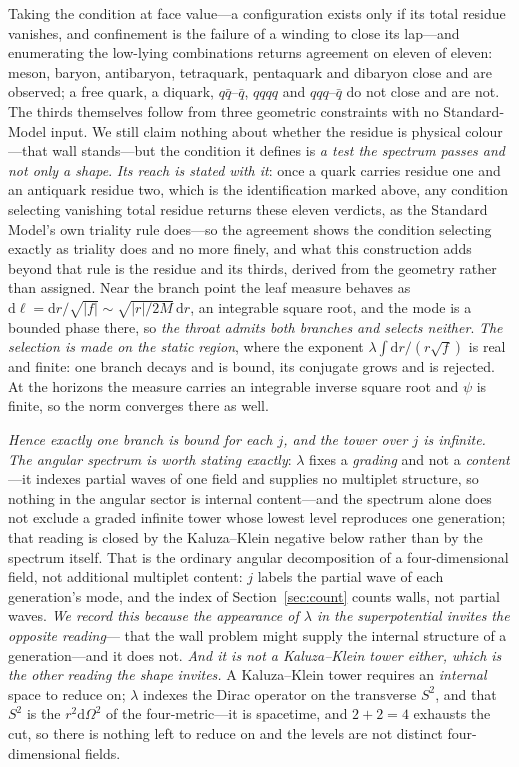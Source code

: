 \documentclass[11pt]{article}
\newcommand{\dd}{\mathrm{d}}
\begin{document}
Taking the condition at face value---a configuration exists only if its total residue
vanishes, and confinement is the failure of a winding to close its lap---and enumerating the
low-lying combinations returns agreement on eleven of eleven: meson, baryon, antibaryon,
tetraquark, pentaquark and dibaryon close and are observed; a free quark, a diquark,
$q\bar q$--$\bar q$, $qqqq$ and $qqq$--$\bar q$ do not close and are not.  The thirds themselves
follow from three geometric constraints with no Standard-Model input.  We still claim nothing
about whether the residue is physical colour---that wall stands---but the condition it defines is
\emph{a test the spectrum passes and not only a shape}. \emph{Its reach is stated with it}: once a quark carries residue one and
an antiquark residue two, which is the identification marked above, any condition selecting vanishing total
residue returns these eleven verdicts, as the Standard Model's own triality rule does---so the agreement shows
the condition selecting exactly as triality does and no more finely, and what this construction adds beyond
that rule is the residue and its thirds, derived from the geometry rather than assigned.
Near the branch point the leaf measure behaves as
$\dd\ell=\dd r/\sqrt{\lvert f\rvert}\sim\sqrt{\lvert r\rvert/2M}\,\dd r$, an integrable square root, and
the mode is a bounded phase there, so \emph{the throat admits both branches and selects neither}.
\emph{The selection is made on the static region}, where the exponent
$\lambda\!\int\!\dd r/(r\sqrt f)$ is real and finite: one branch decays and is bound, its conjugate
grows and is rejected. At the horizons the measure carries an integrable inverse square root and $\psi$ is finite, so the
norm converges there as well.

\emph{Hence exactly one branch is bound for each $j$, and the tower over $j$ is infinite.} \emph{The angular spectrum is worth stating exactly}: $\lambda$ fixes a \emph{grading} and not a \emph{content}---it indexes partial waves of one field and supplies no multiplet structure, so nothing in the angular sector is internal content---and the spectrum alone does not exclude a graded infinite tower whose lowest level reproduces one generation; that reading is closed by the Kaluza--Klein negative below rather than by the spectrum itself. That is the ordinary
angular decomposition of a four-dimensional field, not additional multiplet content: $j$ labels the partial
wave of each generation's mode, and the index of Section~\ref{sec:count} counts walls, not partial waves.
\emph{We record this because the appearance of $\lambda$ in the superpotential invites the opposite reading}---
that the wall problem might supply the internal structure of a generation---and it does not. \emph{And it is not a Kaluza--Klein tower either, which is the other reading the shape invites.} A Kaluza--Klein tower requires an \emph{internal} space to reduce on; $\lambda$ indexes the Dirac operator on the transverse $S^{2}$, and that $S^{2}$ is the $r^{2}\dd\Omega^{2}$ of the four-metric---it is spacetime, and $2+2=4$ exhausts the cut, so there is nothing left to reduce on and the levels are not distinct four-dimensional fields. 
\end{document}
